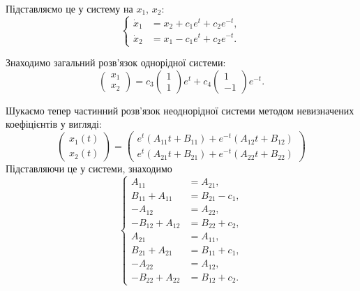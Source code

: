 \begin{solution}
    Підставляємо це у систему на $x_1$, $x_2$:
    \[ \left\{ \begin{aligned}
        \dot x_1 &= x_2 + c_1 e^t + c_2 e^{-t}, \\
        \dot x_2 &= x_1 - c_1 e^t + c_2 e^{-t}.
    \end{aligned} \right. \]
    
    Знаходимо загальний розв'язок однорідної системи:
    \begin{equation}
        \begin{pmatrix} x_1 \\ x_2 \end{pmatrix} = c_3 \begin{pmatrix} 1 \\ 1 \end{pmatrix} e^t + c_4 \begin{pmatrix} 1 \\ -1 \end{pmatrix} e^{-t}.
    \end{equation}
    
    Шукаємо тепер частинний розв'язок неоднорідної системи методом невизначених коефіцієнтів у вигляді:
    \begin{equation}
        \begin{pmatrix} x_1(t) \\ x_2(t) \end{pmatrix} = \begin{pmatrix} e^t (A_{11} t + B_{11}) + e^{-t} (A_{12} t + B_{12}) \\ e^t (A_{21} t + B_{21}) + e^{-t} (A_{22} t + B_{22})  \end{pmatrix}
    \end{equation}
    Підставляючи це у системи, знаходимо
    \[ \left\{ \begin{aligned}
        A_{11} &= A_{21}, \\
        B_{11} + A_{11} &= B_{21} - c_1, \\
        -A_{12} &= A_{22}, \\
        - B_{12} + A_{12} &= B_{22} + c_2, \\
        A_{21} &= A_{11}, \\
        B_{21} + A_{21} &= B_{11} + c_1, \\
        -A_{22} &= A_{12}, \\
        - B_{22} + A_{22} &= B_{12} + c_2.
    \end{aligned} \right. \]
    

\end{solution}
